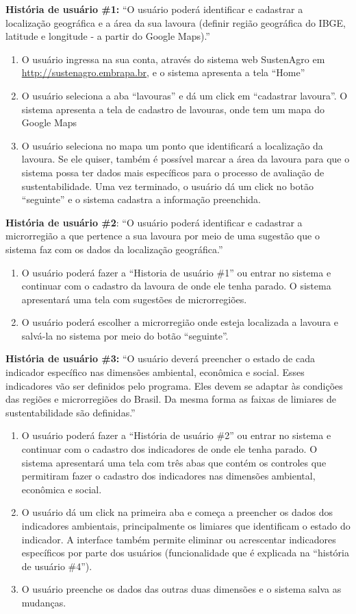\textbf{História de usuário \#1:} “O usuário poderá identificar e
cadastrar a localização geográfica e a área da sua lavoura (definir
região geográfica do IBGE, latitude e longitude - a partir do Google
Maps).”
\begin{enumerate}
\item O usuário ingressa na sua conta, através do sistema web SustenAgro
em \url{http://sustenagro.embrapa.br}, e o sistema apresenta a tela
“Home” 
\item O usuário seleciona a aba “lavouras” e dá um click em ``cadastrar
lavoura''. O sistema apresenta a tela de cadastro de lavouras, onde
tem um mapa do Google Maps 
\item O usuário seleciona no mapa um ponto que identificará a localização
da lavoura. Se ele quiser, também é possível marcar a área da lavoura
para que o sistema possa ter dados mais específicos para o processo
de avaliação de sustentabilidade. Uma vez terminado, o usuário dá
um click no botão “seguinte” e o sistema cadastra a informação preenchida. 
\end{enumerate}
\textbf{História de usuário \#2}: “O usuário poderá identificar e
cadastrar a microrregião a que pertence a sua lavoura por meio de
uma sugestão que o sistema faz com os dados da localização geográfica.”
\begin{enumerate}
\item O usuário poderá fazer a “Historia de usuário \#1” ou entrar no sistema
e continuar com o cadastro da lavoura de onde ele tenha parado. O
sistema apresentará uma tela com sugestões de microrregiões. 
\item O usuário poderá escolher a microrregião onde esteja localizada a
lavoura e salvá-la no sistema por meio do botão ``seguinte''. 
\end{enumerate}
\textbf{História de usuário \#3:} “O usuário deverá preencher o estado
de cada indicador específico nas dimensões ambiental, econômica e
social. Esses indicadores vão ser definidos pelo programa. Eles devem
se adaptar às condições das regiões e microrregiões do Brasil. Da
mesma forma as faixas de limiares de sustentabilidade são definidas.''
\begin{enumerate}
\item O usuário poderá fazer a “História de usuário \#2” ou entrar no sistema
e continuar com o cadastro dos indicadores de onde ele tenha parado.
O sistema apresentará uma tela com três abas que contém os controles
que permitiram fazer o cadastro dos indicadores nas dimensões ambiental,
econômica e social. 
\item O usuário dá um click na primeira aba e começa a preencher os dados
dos indicadores ambientais, principalmente os limiares que identificam
o estado do indicador. A interface também permite eliminar ou acrescentar
indicadores específicos por parte dos usuários (funcionalidade que
é explicada na “história de usuário \#4”). 
\item O usuário preenche os dados das outras duas dimensões e o sistema
salva as mudanças.
\end{enumerate}
